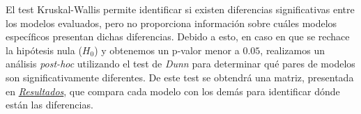 El test Kruskal-Wallis permite identificar si existen diferencias significativas entre los modelos evaluados, pero no proporciona información sobre cuáles modelos específicos presentan dichas diferencias. Debido a esto, en caso en que se rechace la hipótesis nula ($H_0$) y obtenemos un p-valor menor a $0.05$, realizamos un análisis \textit{post-hoc} utilizando el test de \textit{Dunn} para determinar qué pares de modelos son significativamente diferentes. De este test se obtendrá una matriz, presentada en \hyperref[ch::capitulo7]{\textit{Resultados}}, que compara cada modelo con los demás para identificar dónde están las diferencias.

